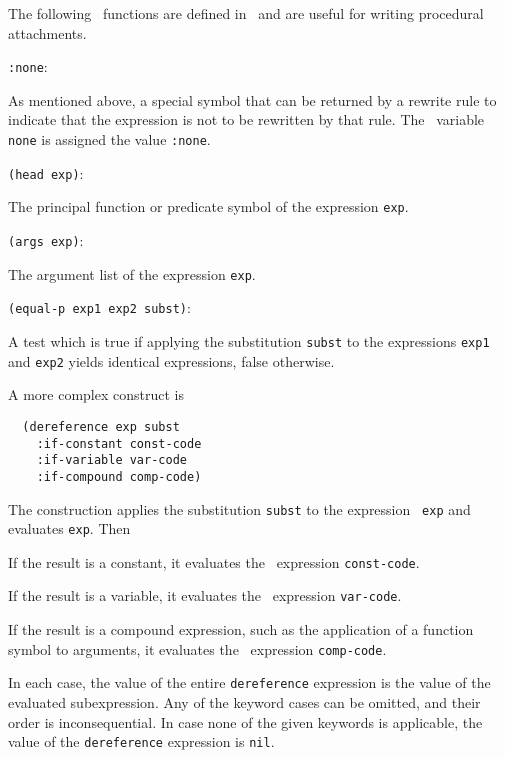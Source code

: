 The following \lisp\   functions are defined in \snark\  and are useful for
writing procedural attachments.

\begin{description}

 \item{{\tt :none}:}

 As mentioned above, a special symbol that can be returned by a rewrite rule to
 indicate that the expression is not to be rewritten by that rule.  The
 \lisp\  variable {\tt none} is assigned the value {\tt :none}.

 \item{\verb'(head exp)':}

 The principal function or predicate symbol of the expression {\tt exp}.

 \item{\verb'(args exp)':}

 The argument list of the expression {\tt exp}.

 \item{\verb'(equal-p exp1 exp2 subst)':}

 A test which is true if applying the substitution {\tt subst} to the
 expressions {\tt exp1} and {\tt exp2} yields identical expressions, false
 otherwise.
\end{description}

A more complex construct is
\begin{verbatim}
  (dereference exp subst
    :if-constant const-code
    :if-variable var-code
    :if-compound comp-code)
\end{verbatim}
The construction applies the substitution {\tt subst} to the expression {\tt
exp} and evaluates {\tt exp}.   Then
\begin{description}

 \item{{\mbox{}}} If the result is a constant, it evaluates the \lisp\
  expression {\tt const-code}.

 \item{{\mbox{}}} If the result is a variable, it evaluates the \lisp\
  expression {\tt var-code}.

 \item{{\mbox{}}} If the result is a compound expression, such as the
  application of a function symbol to arguments, it evaluates the \lisp\
  expression {\tt comp-code}.

\end{description}
In each case, the value of the entire {\tt dereference} expression is the
  value of the evaluated subexpression.  Any of the keyword cases can be
  omitted, and their order is inconsequential.  In case none of the given
  keywords is applicable, the value of the {\tt dereference} expression is
  {\tt nil}.

